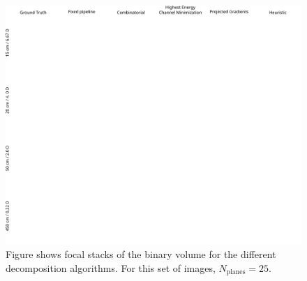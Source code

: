 \begin{figure}[!htb]
\centering
\includegraphics[width=0.99\columnwidth]{images/volumetric/acd_exp4/exp_FS}
\caption[Volumetric NED: Adaptive decomposition results: Focal stacks for opaque objects and $N_{\text{planes}}=25$]{Figure shows focal stacks of the binary volume for the different decomposition algorithms. For this set of images, $N_{\text{planes}}=25$.}
\label{fig:volumetric:acd:exp4:focalstack}
\end{figure}

